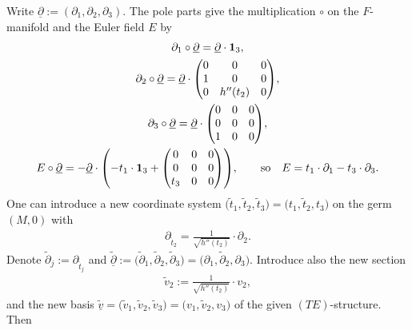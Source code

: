 \documentclass[10pt,a4paper]{amsart}
\numberwithin{equation}{section}
\numberwithin{figure}{section}
\newcommand{\www}{\widetilde}
\newcommand{\uuuu}{\underline}
\newcommand{\paa}{\partial}
\begin{document}
Write $\uuuu\paa:=(\paa_1,\paa_2,\paa_3)$.
The pole parts give the multiplication $\circ$ on the
$F$-manifold and the Euler field $E$ by
\begin{gather*}%
\paa_1\circ\uuuu{\paa}=\uuuu{\paa}\cdot{\bf 1}_3,\\
\paa_2\circ\uuuu{\paa}= \uuuu{\paa}\cdot
\begin{pmatrix}0&0&0\\1&0&0\\0&h''(t_2)&0\end{pmatrix}\!,\nonumber\\
\paa_3\circ\uuuu{\paa}= \uuuu{\paa}\cdot
\begin{pmatrix}0&0&0\\0&0&0\\1&0&0\end{pmatrix}\!,\nonumber\\
E\circ\uuuu{\paa}= -\uuuu{\paa}\cdot
\left(-t_1\cdot {\bf 1}_3
+\begin{pmatrix}0&0&0\\0&0&0\\t_3&0&0\end{pmatrix}\right)\!,\qquad
\text{so}\quad E= t_1\cdot\paa_1-t_3\cdot\paa_3.\nonumber
\end{gather*}
One can introduce a new coordinate system
$\big(\www t_1,\www t_2,\www t_3\big)=\big(t_1,\www t_2,t_3\big)$ on the germ
$(M,0)$ with
\begin{gather*}%
\paa_{\www t_2}=\frac{1}{\sqrt{h''(t_2)}}\cdot\paa_2.
\end{gather*}
Denote $\www\paa_j:=\paa_{\www t_j}$
and $\www{\uuuu\paa}:=\big(\www\paa_1,\www\paa_2,
\www\paa_3\big)=\big(\paa_1,\www\paa_2,\paa_3\big)$.
Introduce also the new section
\begin{gather*}%
\www v_2:=\frac{1}{\sqrt{h''(t_2)}}\cdot v_2,
\end{gather*}
and the new basis
$\www{\uuuu v}=\big(\www v_1,\www v_2,\www v_3\big)
=\big(v_1,\www v_2,v_3\big)$
of the given $(TE)$-structure. Then
\end{document}
